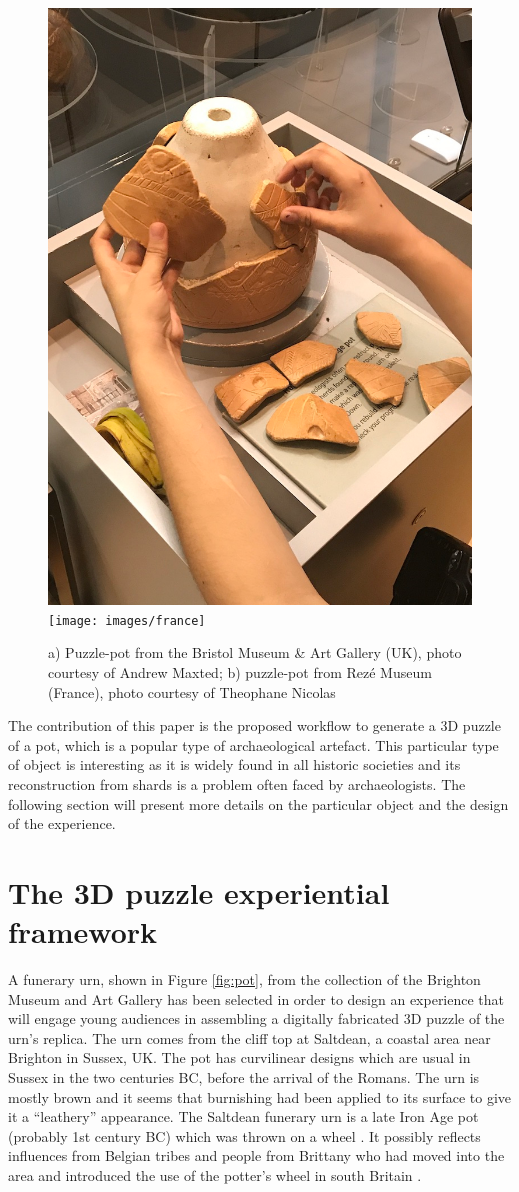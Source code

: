 \documentclass[acmlarge,screen]{acmart}
\begin{document}

\begin{figure}[htb]
  \centering
  \includegraphics[width=0.45\linewidth]{images/uk}
    \texttt{[image: images/france]}
  \caption{\label{fig:puz}
    a) Puzzle-pot from the Bristol Museum \& Art Gallery (UK), photo courtesy of Andrew Maxted;
        b)  puzzle-pot from Rez\'e Museum (France), photo courtesy of Theophane Nicolas}
\end{figure}
  


The contribution of this paper is the proposed workflow to generate a 3D puzzle of a pot, which is a popular type of archaeological artefact. This particular type of object is interesting as it is widely found in all historic societies and its reconstruction from shards is a problem often faced by archaeologists. The following section will present more details on the particular object and the design of the experience.

\section{The 3D puzzle experiential framework}
\label{requirements}
A funerary urn, shown in Figure \ref{fig:pot}, from the collection of the Brighton Museum and Art Gallery has been selected in order to design an experience that will engage young audiences in assembling a digitally fabricated 3D puzzle of the urn's replica. The urn comes from the cliff top at Saltdean, a coastal area near Brighton in Sussex, UK. The pot has curvilinear designs which are usual in Sussex in the two centuries BC, before the arrival of the Romans. The urn is mostly brown and it seems that burnishing had been applied to its surface to give it a ``leathery'' appearance. The Saltdean funerary urn is a late Iron Age pot (probably 1st century BC) which was thrown on a wheel \cite{Toms1912}. It possibly reflects influences from Belgian tribes and people from Brittany who had moved into the area and introduced the use of the potter's wheel in south Britain \cite{Harding1974,Cunliffe1978,Adkins1982,Cunliffe1995}.
\end{document}
